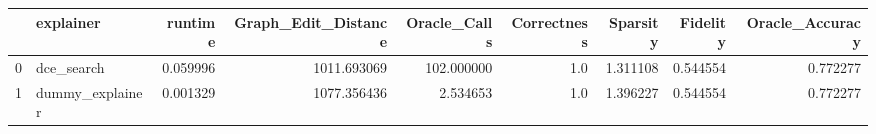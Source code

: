 \begin{tabular}{llrrrrrrr}
\toprule
{} &        explainer &   runtime &  Graph\_Edit\_Distance &  Oracle\_Calls &  Correctness &  Sparsity &  Fidelity &  Oracle\_Accuracy \\
\midrule
0 &       dce\_search &  0.059996 &          1011.693069 &    102.000000 &          1.0 &  1.311108 &  0.544554 &         0.772277 \\
1 &  dummy\_explainer &  0.001329 &          1077.356436 &      2.534653 &          1.0 &  1.396227 &  0.544554 &         0.772277 \\
\bottomrule
\end{tabular}
